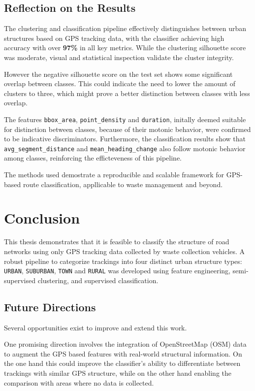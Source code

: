 \documentclass[a4paper,12pt,twoside]{scrreprt}
\begin{document}
\section{Reflection on the Results}

The clustering and classification pipeline effectively distinguishes between
urban structures based on GPS tracking data, with the classifier achieving high
accuracy with over \textbf{97\%} in all
key metrics. While the clustering silhouette score was moderate, visual and
statistical inspection validate the cluster integrity.

However the negative silhouette score on the test set shows some significant
overlap between classes. This could
indicate the need to lower the amount of clusters to three, which
might prove a better distinction between classes with less overlap.

The features \texttt{bbox\_area}, \texttt{point\_density} and
\texttt{duration},
initally deemed suitable for distinction between classes, because of their
motonic
behavior, were confirmed to be indicative discriminators.
Furthermore, the
classification results show that \texttt{avg\_segment\_distance} and
\texttt{mean\_heading\_change} also follow motonic behavior among classes,
reinforcing the efficteveness of this pipeline.

The methods used demostrate a reproducible and scalable framework for GPS-based
route classification, appllicable to waste management and beyond.

\chapter{Conclusion}

This thesis demonstrates that it is feasible to classify the structure of road
networks
using only GPS tracking data collected by waste collection vehicles.
A robust pipeline to categorize trackings into four distinct urban structure
types: \texttt{URBAN}, \texttt{SUBURBAN}, \texttt{TOWN} and \texttt{RURAL} was
developed using feature engineering, semi-supervised clustering, and supervised
classification.

\section{Future Directions}

Several opportunities exist to improve and extend this work.

One promising direction involves the integration of OpenStreetMap (OSM) data to
augment the GPS based features with real-world structural information. On the
one hand this could improve the classifier's ability to differentiate between
trackings with similar GPS structure, while on the other hand enabling the
comparison with areas where no data is collected.
\end{document}
